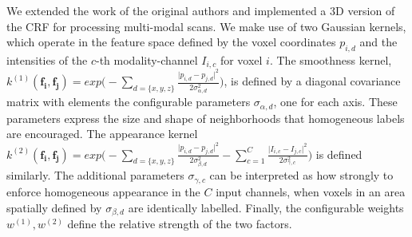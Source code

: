 We extended the work of the original authors and implemented a 3D version of the CRF for processing multi-modal scans. We make use of two Gaussian kernels, which operate in the feature space defined by the voxel coordinates $p_{i,d}$ and the intensities of the $c$-th modality-channel $I_{i,c}$ for voxel $i$. The smoothness kernel, $k^{(1)}(\mathbf{f_i}, \mathbf{f_j}) = exp\Big(- \sum_{d=\{x,y,z\}}{ \frac{\vert p_{i,d} - p_{j,d} \vert ^2}{2\sigma_{\alpha, d}^2} } \Big)$, is defined by a diagonal covariance matrix with elements the configurable parameters $\sigma_{\alpha, d}$, one for each axis. These parameters express the size and shape of neighborhoods that homogeneous labels are encouraged. The appearance kernel $ k^{(2)}(\mathbf{f_i},\mathbf{f_j}) = exp \Big( - \sum_{d=\{x,y,z\}}{ \frac{\vert p_{i,d}-p_{j,d} \vert ^2}{2\sigma_{\beta,d}^2} } - \sum_{c=1}^{C}{ \frac{\vert I_{i,c} - I_{j,c} \vert ^2}{2\sigma_{\gamma,c}^2} } \Big) $ is defined similarly. The additional parameters $\sigma_{\gamma,c}$ can be interpreted as how strongly to enforce homogeneous appearance in the $C$ input channels, when voxels in an area spatially defined by $\sigma_{\beta,d}$ are identically labelled. Finally, the configurable weights $w^{(1)},w^{(2)}$ define the relative strength of the two factors.

